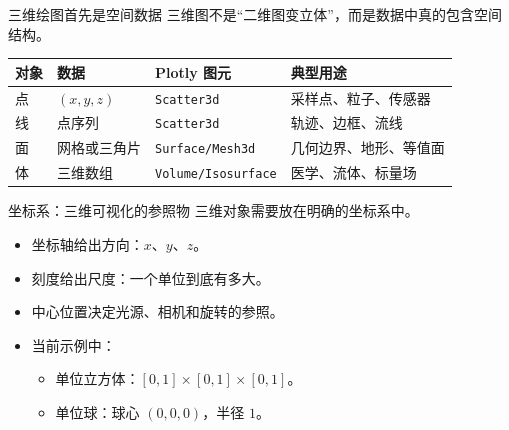 \documentclass[aspectratio=169,11pt]{ctexbeamer}
\begin{document}
\begin{frame}{三维绘图首先是空间数据}
  三维图不是“二维图变立体”，而是数据中真的包含空间结构。

  \begin{table}
    \centering
    \begin{tabularx}{0.9\linewidth}{lllX}
      \toprule
      对象 & 数据 & Plotly 图元 & 典型用途 \\
      \midrule
      点 & \((x,y,z)\) & \texttt{Scatter3d} & 采样点、粒子、传感器 \\
      线 & 点序列 & \texttt{Scatter3d} & 轨迹、边框、流线 \\
      面 & 网格或三角片 & \texttt{Surface/Mesh3d} & 几何边界、地形、等值面 \\
      体 & 三维数组 & \texttt{Volume/Isosurface} & 医学、流体、标量场 \\
      \bottomrule
    \end{tabularx}
  \end{table}
\end{frame}

\begin{frame}{坐标系：三维可视化的参照物}
  三维对象需要放在明确的坐标系中。

  \begin{itemize}
    \item 坐标轴给出方向：\(x\)、\(y\)、\(z\)。
    \item 刻度给出尺度：一个单位到底有多大。
    \item 中心位置决定光源、相机和旋转的参照。
    \item 当前示例中：
      \begin{itemize}
        \item 单位立方体：\([0,1]\times[0,1]\times[0,1]\)。
        \item 单位球：球心 \((0,0,0)\)，半径 \(1\)。
      \end{itemize}
  \end{itemize}
\end{frame}
\end{document}
